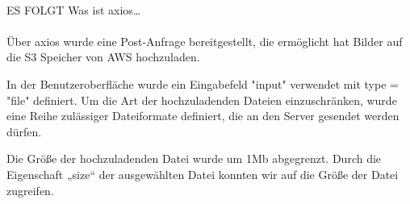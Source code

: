 \paragraph{}
ES FOLGT Was ist axios…

\paragraph{}
Über axios wurde eine Post-Anfrage bereitgestellt, die ermöglicht hat Bilder auf die S3 Speicher von AWS hochzuladen.

In der Benutzeroberfläche wurde ein Eingabefeld "input" verwendet mit type = "file" definiert.
Um die Art der hochzuladenden Dateien einzuschränken, wurde eine Reihe zulässiger Dateiformate definiert, die an den Server gesendet werden dürfen.


Die Größe der hochzuladenden Datei wurde um 1Mb abgegrenzt.
Durch die Eigenschaft „size“ der ausgewählten Datei konnten wir auf die Größe der Datei zugreifen.

